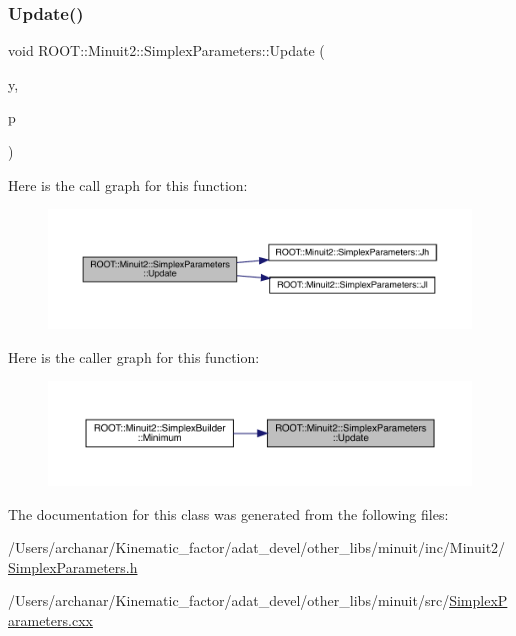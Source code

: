 \mbox{\label{classROOT_1_1Minuit2_1_1SimplexParameters_aa9536cc9c7754ce308160d5e456ac54f}} 
\subsubsection{\texorpdfstring{Update()}{Update()}\hspace{0.1cm}{\footnotesize\ttfamily [2/2]}}
{\footnotesize\ttfamily void R\+O\+O\+T\+::\+Minuit2\+::\+Simplex\+Parameters\+::\+Update (\begin{DoxyParamCaption}\item[{double}]{y,  }\item[{const \mbox{\hyperlink{namespaceROOT_1_1Minuit2_a62ed97730a1ca8d3fbaec64a19aa11c9}{Mn\+Algebraic\+Vector}} \&}]{p }\end{DoxyParamCaption})}

Here is the call graph for this function\+:\nopagebreak
\begin{figure}[H]
\begin{center}
\leavevmode
\includegraphics[width=350pt]{d7/da2/classROOT_1_1Minuit2_1_1SimplexParameters_aa9536cc9c7754ce308160d5e456ac54f_cgraph}
\end{center}
\end{figure}
Here is the caller graph for this function\+:\nopagebreak
\begin{figure}[H]
\begin{center}
\leavevmode
\includegraphics[width=350pt]{d7/da2/classROOT_1_1Minuit2_1_1SimplexParameters_aa9536cc9c7754ce308160d5e456ac54f_icgraph}
\end{center}
\end{figure}


The documentation for this class was generated from the following files\+:\begin{DoxyCompactItemize}
\item 
/\+Users/archanar/\+Kinematic\+\_\+factor/adat\+\_\+devel/other\+\_\+libs/minuit/inc/\+Minuit2/\mbox{\hyperlink{other__libs_2minuit_2inc_2Minuit2_2SimplexParameters_8h}{Simplex\+Parameters.\+h}}\item 
/\+Users/archanar/\+Kinematic\+\_\+factor/adat\+\_\+devel/other\+\_\+libs/minuit/src/\mbox{\hyperlink{SimplexParameters_8cxx}{Simplex\+Parameters.\+cxx}}\end{DoxyCompactItemize}

